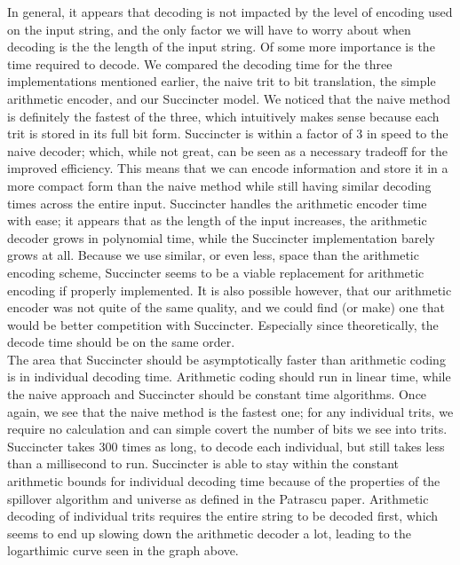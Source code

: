 \documentclass{article}
\begin{document}
In general, it appears that decoding is not impacted by the level of encoding used on the input string, and the only factor we will have to worry about when decoding is the the length of the input string. Of some more importance is the time required to decode. We compared the decoding time for the three implementations mentioned earlier, the naive trit to bit translation, the simple arithmetic encoder, and our Succincter model. We noticed that the naive method is definitely the fastest of the three, which intuitively makes sense because each trit is stored in its full bit form. Succincter is within a factor of 3 in speed to the naive decoder; which, while not great, can be seen as a necessary tradeoff for the improved efficiency. This means that we can encode information and store it in a more compact form than the naive method while still having similar decoding times across the entire input. Succincter handles the arithmetic encoder time with ease; it appears that as the length of the input increases, the arithmetic decoder grows in polynomial time, while the Succincter implementation barely grows at all. Because we use similar, or even less, space than the arithmetic encoding scheme, Succincter seems to be a viable replacement for arithmetic encoding if properly implemented. It is also possible however, that our arithmetic encoder was not quite of the same quality, and we could find (or make) one that would be better competition with Succincter. Especially since theoretically, the decode time should be on the same order.\\
\indent The area that Succincter should be asymptotically faster than arithmetic coding is in individual decoding time. Arithmetic coding should run in linear time, while the naive approach and Succincter should be constant time algorithms. Once again, we see that the naive method is the fastest one; for any individual trits, we require no calculation and can simple covert the number of bits we see into trits. Succincter takes 300 times as long, to decode each individual, but still takes less than a millisecond to run. Succincter is able to stay within the constant arithmetic bounds for individual decoding time because of the properties of the spillover algorithm and universe as defined in the Patrascu paper. Arithmetic decoding of individual trits requires the entire string to be decoded first, which seems to end up slowing down the arithmetic decoder a lot, leading to the logarthimic curve seen in the graph above.
\end{document}
